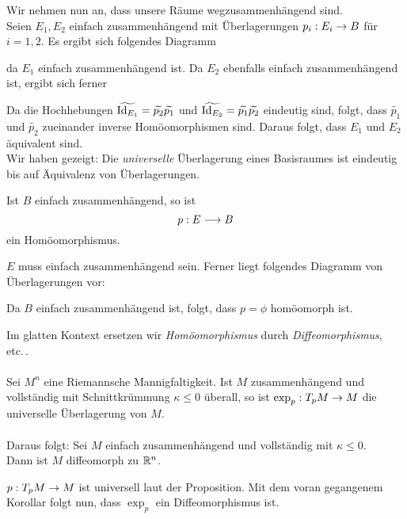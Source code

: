Wir nehmen nun an, dass unsere Räume wegzusammenhängend sind.\\
Seien $E_1, E_2$ einfach zusammenhängend mit Überlagerungen $p_i : E_i \overset{}{\rightarrow} B$ für $i = 1,2$.
Es ergibt sich folgendes Diagramm
\begin{center}
\end{center}
da $E_1$ einfach zusammenhängend ist. Da $E_2$ ebenfalls einfach zusammenhängend ist, ergibt sich ferner
\begin{center}
\end{center}
Da die Hochhebungen $\widetilde{\text{Id}_{E_1}} = \widetilde{p_2} \widetilde{p_1}$ und $\widetilde{\text{Id}_{E_2}}= \widetilde{p_1} \widetilde{p_2}$ eindeutig sind, folgt, dass $\widetilde{p_1}$ und $\widetilde{p_2}$ zueinander inverse Homöomorphismen sind. Daraus folgt, dass $E_1$ und $E_2$ äquivalent sind.\\
Wir haben gezeigt: Die \emph{universelle} Überlagerung eines Basisraumes ist eindeutig bis auf Äquivalenz von Überlagerungen.

\Kor{}
Ist $B$ einfach zusammenhängend, so ist
\[ p : E \overset{}{\longrightarrow} B \]
ein Homöomorphismus.
\begin{Beweis}{}
$E$ muss einfach zusammenhängend sein.
Ferner liegt folgendes Diagramm von Überlagerungen vor:
\begin{center}
\end{center}
Da $B$ einfach zusammenhängend ist, folgt, dass $p = \phi$ homöomorph ist.
\end{Beweis}

\Bem{}
Im glatten Kontext ersetzen wir \emph{Homöomorphismus} durch \emph{Diffeomorphismus}, etc.\,.\\\\

Sei $M^n$ eine Riemannsche Mannigfaltigkeit.
\Prop{}
Ist $M$ zusammenhängend und vollständig mit Schnittkrümmung $\kappa \leq 0$ überall, so ist $\exp_{p} : T_pM \overset{}{\rightarrow} M$ die universelle Überlagerung von $M$.\\\\
Daraus folgt:
Sei $M$ einfach zusammenhängend und vollständig mit $\kappa \leq 0$.\\
Dann ist $M$ diffeomorph zu $\mathbb{R}^n$.
\begin{Beweis}{}
$p : T_pM \overset{}{\rightarrow} M$ ist universell laut der Proposition. Mit dem voran gegangenem Korollar folgt nun, dass $\exp_{p}$ ein Diffeomorphismus ist.
\end{Beweis}

